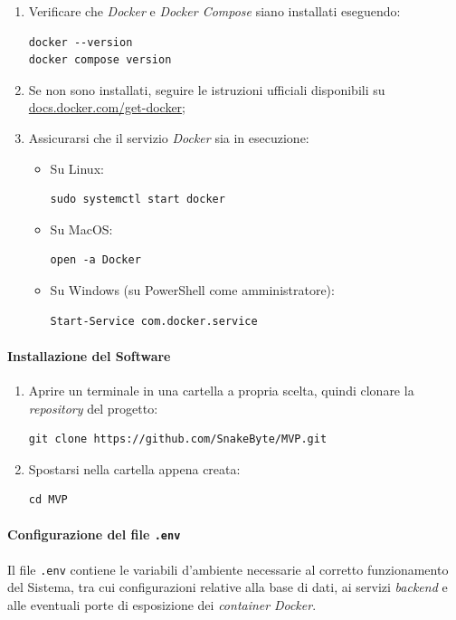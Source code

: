 \documentclass[10pt, letterpaper]{article}
\begin{document}
\begin{enumerate}
    \item Verificare che \textit{Docker} e \textit{Docker Compose} siano installati eseguendo:
\begin{verbatim}
docker --version
docker compose version
\end{verbatim}
    \item Se non sono installati, seguire le istruzioni ufficiali disponibili su \href{https://docs.docker.com/get-docker/}{docs.docker.com/get-docker};
    \item Assicurarsi che il servizio \textit{Docker} sia in esecuzione:
    \begin{itemize}
      \item Su Linux: \begin{verbatim}sudo systemctl start docker\end{verbatim}
      \item Su MacOS: \begin{verbatim}open -a Docker\end{verbatim}
      \item Su Windows (su PowerShell come amministratore): \begin{verbatim}Start-Service com.docker.service\end{verbatim}
\end{itemize}
\end{enumerate}

\paragraph{Installazione del Software}

\begin{enumerate}
    \item Aprire un terminale in una cartella a propria scelta, quindi clonare 
    la \textit{repository} del progetto:
\begin{verbatim}
git clone https://github.com/SnakeByte/MVP.git
\end{verbatim}
    \item Spostarsi nella cartella appena creata:
\begin{verbatim}
cd MVP
\end{verbatim}
\end{enumerate}

\paragraph{Configurazione del file \texttt{.env}}
Il file \texttt{.env} contiene le variabili d'ambiente necessarie al corretto funzionamento del Sistema, 
tra cui configurazioni relative alla base di dati, ai servizi \textit{backend} e alle eventuali porte di esposizione dei \textit{container} \textit{Docker}.
\end{document}
